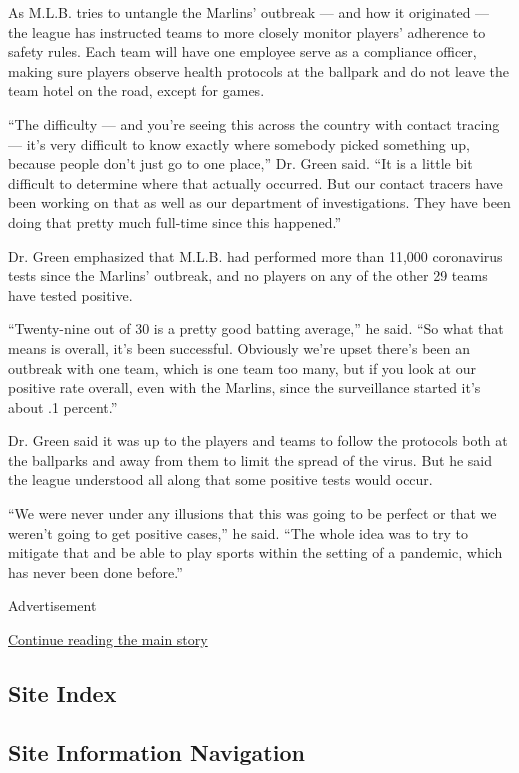 As M.L.B. tries to untangle the Marlins' outbreak --- and how it
originated --- the league has instructed teams to more closely monitor
players' adherence to safety rules. Each team will have one employee
serve as a compliance officer, making sure players observe health
protocols at the ballpark and do not leave the team hotel on the road,
except for games.

``The difficulty --- and you're seeing this across the country with
contact tracing --- it's very difficult to know exactly where somebody
picked something up, because people don't just go to one place,'' Dr.
Green said. ``It is a little bit difficult to determine where that
actually occurred. But our contact tracers have been working on that as
well as our department of investigations. They have been doing that
pretty much full-time since this happened.''

Dr. Green emphasized that M.L.B. had performed more than 11,000
coronavirus tests since the Marlins' outbreak, and no players on any of
the other 29 teams have tested positive.

``Twenty-nine out of 30 is a pretty good batting average,'' he said.
``So what that means is overall, it's been successful. Obviously we're
upset there's been an outbreak with one team, which is one team too
many, but if you look at our positive rate overall, even with the
Marlins, since the surveillance started it's about .1 percent.''

Dr. Green said it was up to the players and teams to follow the
protocols both at the ballparks and away from them to limit the spread
of the virus. But he said the league understood all along that some
positive tests would occur.

``We were never under any illusions that this was going to be perfect or
that we weren't going to get positive cases,'' he said. ``The whole idea
was to try to mitigate that and be able to play sports within the
setting of a pandemic, which has never been done before.''

Advertisement

\protect\hyperlink{after-bottom}{Continue reading the main story}

\hypertarget{site-index}{%
\subsection{Site Index}\label{site-index}}

\hypertarget{site-information-navigation}{%
\subsection{Site Information
Navigation}\label{site-information-navigation}}

